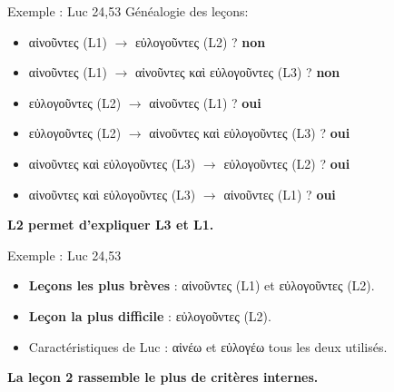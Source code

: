 \documentclass[11pt]{beamer}
\begin{document}
\begin{frame}{Exemple : Luc 24,53}
Généalogie des leçons:
    \begin{itemize}
        \item \textgreek{αἰνοῦντες} (L1) $\rightarrow$ \textgreek{εὐλογοῦντες} (L2) ? \pause
        \textbf{non}
        
        \item \textgreek{αἰνοῦντες} (L1) $\rightarrow$ \textgreek{αἰνοῦντες καὶ εὐλογοῦντες} (L3) ?
        \pause
        \textbf{non}
        
        \item \textgreek{εὐλογοῦντες} (L2) $\rightarrow$ \textgreek{αἰνοῦντες} (L1) ?
        \pause
        \textbf{oui}
        
        \item \textgreek{εὐλογοῦντες} (L2) $\rightarrow$ \textgreek{αἰνοῦντες καὶ εὐλογοῦντες} (L3) ?
        \pause 
        \textbf{oui}

        \item \textgreek{αἰνοῦντες καὶ εὐλογοῦντες} (L3) $\rightarrow$ \textgreek{εὐλογοῦντες} (L2) ?
        \pause
        \textbf{oui}
        
        
        \item \textgreek{αἰνοῦντες καὶ εὐλογοῦντες} (L3) $\rightarrow$ \textgreek{αἰνοῦντες} (L1) ?
        \pause
        \textbf{oui}
    \end{itemize}
    \textbf{L2 permet d'expliquer L3 et L1.}
\end{frame}

\begin{frame}{Exemple : Luc 24,53}
\begin{itemize}
    \item \textbf{Leçons les plus brèves} : 
    \pause
    \textgreek{αἰνοῦντες} (L1) et \textgreek{εὐλογοῦντες} (L2).
    \item \textbf{Leçon la plus difficile} : 
    \pause
    \textgreek{εὐλογοῦντες} (L2).
    \item Caractéristiques de Luc : \textgreek{αἰνέω} et \textgreek{εὐλογέω} tous les deux utilisés.
\end{itemize}

\begin{block}{}
    \textbf{La leçon 2 rassemble le plus de critères internes.}

\end{block}

\end{frame}
\end{document}
